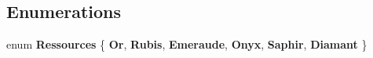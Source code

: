 \subsection*{Enumerations}
\begin{DoxyCompactItemize}
\item 
\mbox{\label{namespace_splendor_abc955fe800ad5f701f777df0a2a29dc2}} 
enum {\bfseries Ressources} \{ \newline
{\bfseries Or}, 
{\bfseries Rubis}, 
{\bfseries Emeraude}, 
{\bfseries Onyx}, 
\newline
{\bfseries Saphir}, 
{\bfseries Diamant}
 \}
\end{DoxyCompactItemize}
